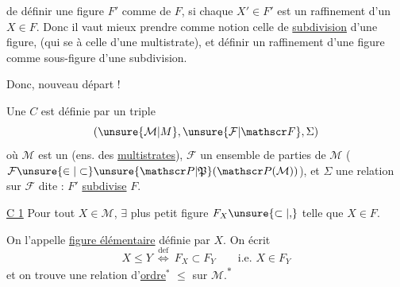 de définir une figure $F'$ comme  \uline{} de $F$, si chaque $X'\in F'$  est un raffinement d'un $X\in F$. Donc il vaut mieux prendre comme notion  celle de \uline{subdivision} d'une  figure, (qui  se  à celle d'une multistrate), et définir un raffinement d'une figure comme sous-figure d'une subdivision.

Donc, nouveau départ !

Une  $C$ est définie par un triple
\[
 (\unsure{\mathcal M|M},\unsure{\mathcal F|\mathscr F},\Sigma)
\]
où $\mathcal M$ est un  (ens. des \uline{multistrates}), $\mathcal F$ un ensemble de parties de $\mathcal M$ ($\mathcal F\unsure{\in|\subset}\unsure{\mathscr P|\mathfrak P}(\mathscr P(\mathcal M))$),  et $\Sigma$ une relation sur $\mathcal F$ dite : $F'$ \uline{subdivise} $F$. 

\uline{C 1} Pour tout $X\in\mathcal M$, $\exists$  plus petit  figure  $F_X\unsure{\subset|{,}}$ telle que $X\in F$.

On l'appelle  \uline{figure élémentaire} définie par $X$. On écrit
\[
 X\leq Y\ \overset{\mathrm{def}}{\Longleftrightarrow}\ F_X\subset F_Y\qquad\text{i.e. }X\in F_Y
\]
et on trouve une relation d'\uline{ordre}$^{*}$ $\leq$ sur $\mathcal M$.\textsuperscript{$*$}
